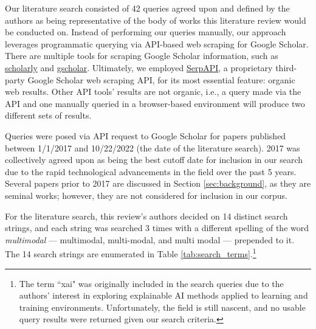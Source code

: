 \documentclass[manuscript,screen,review]{acmart}
\begin{document}
Our literature search consisted of 42 queries agreed upon and defined by the authors as being representative of the body of works this literature review would be conducted on. Instead of performing our queries manually, our approach leverages programmatic querying via API-based web scraping for Google Scholar. There are multiple tools for scraping Google Scholar information, such as \href{https://pypi.org/project/scholarly/}{scholarly} and \href{https://github.com/venthur/gscholar}{gscholar}. Ultimately, we employed \href{https://serpapi.com/google-scholar-api}{SerpAPI}, a proprietary third-party Google Scholar web scraping API, for its most essential feature: organic web results. Other API tools' results are not organic, i.e., a query made via the API and one manually queried in a browser-based environment will produce two different sets of results.

Queries were posed via API request to Google Scholar for papers published between 1/1/2017 and 10/22/2022 (the date of the literature search). 2017 was collectively agreed upon as being the best cutoff date for inclusion in our search due to the rapid technological advancements in the field over the past 5 years. Several papers prior to 2017 are discussed in Section \ref{sec:background}, as they are seminal works; however, they are not considered for inclusion in our corpus. 

For the literature search, this review's authors decided on 14 distinct search strings, and each string was searched 3 times with a different spelling of the word \textit{multimodal} --- multimodal, multi-modal, and multi modal --- prepended to it. The 14 search strings are enumerated in Table \ref{tab:search_terms}.\footnote{The term ``xai" was originally included in the search queries due to the authors' interest in exploring explainable AI methods applied to learning and training environments. Unfortunately, the field is still nascent, and no usable query results were returned given our search criteria.}
\end{document}
